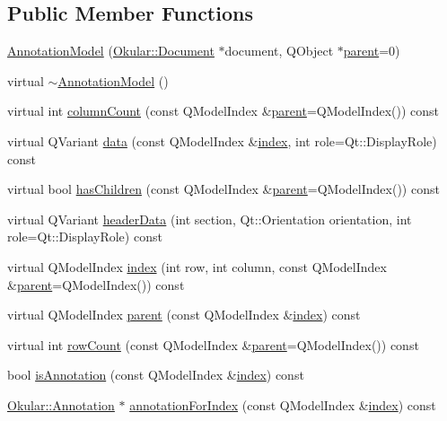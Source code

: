 \subsection*{Public Member Functions}
\begin{DoxyCompactItemize}
\item 
\hyperlink{classAnnotationModel_a29e844bf6e46f3dfa68da27d697bfdd4}{Annotation\+Model} (\hyperlink{classOkular_1_1Document}{Okular\+::\+Document} $\ast$document, Q\+Object $\ast$\hyperlink{classAnnotationModel_a162b06526b09c901a687d982051f639c}{parent}=0)
\item 
virtual \hyperlink{classAnnotationModel_ada5d073aa78e291b8422def55dd62199}{$\sim$\+Annotation\+Model} ()
\item 
virtual int \hyperlink{classAnnotationModel_a4a3dd262e42e0da24efa05adb42b1e70}{column\+Count} (const Q\+Model\+Index \&\hyperlink{classAnnotationModel_a162b06526b09c901a687d982051f639c}{parent}=Q\+Model\+Index()) const 
\item 
virtual Q\+Variant \hyperlink{classAnnotationModel_a179ccebf0ac079ea298ebafa9347eac1}{data} (const Q\+Model\+Index \&\hyperlink{classAnnotationModel_a0f1848b826fd58979667dc6f5966fee8}{index}, int role=Qt\+::\+Display\+Role) const 
\item 
virtual bool \hyperlink{classAnnotationModel_a596a4986b66a9d3271856f0bff06bfd0}{has\+Children} (const Q\+Model\+Index \&\hyperlink{classAnnotationModel_a162b06526b09c901a687d982051f639c}{parent}=Q\+Model\+Index()) const 
\item 
virtual Q\+Variant \hyperlink{classAnnotationModel_a798301e19593d4861ec83edec04aa29d}{header\+Data} (int section, Qt\+::\+Orientation orientation, int role=Qt\+::\+Display\+Role) const 
\item 
virtual Q\+Model\+Index \hyperlink{classAnnotationModel_a0f1848b826fd58979667dc6f5966fee8}{index} (int row, int column, const Q\+Model\+Index \&\hyperlink{classAnnotationModel_a162b06526b09c901a687d982051f639c}{parent}=Q\+Model\+Index()) const 
\item 
virtual Q\+Model\+Index \hyperlink{classAnnotationModel_a162b06526b09c901a687d982051f639c}{parent} (const Q\+Model\+Index \&\hyperlink{classAnnotationModel_a0f1848b826fd58979667dc6f5966fee8}{index}) const 
\item 
virtual int \hyperlink{classAnnotationModel_a519bc642d990f530aa3a4315d819a0d2}{row\+Count} (const Q\+Model\+Index \&\hyperlink{classAnnotationModel_a162b06526b09c901a687d982051f639c}{parent}=Q\+Model\+Index()) const 
\item 
bool \hyperlink{classAnnotationModel_a29cb1f9d54f20e8024dffcb3433a446f}{is\+Annotation} (const Q\+Model\+Index \&\hyperlink{classAnnotationModel_a0f1848b826fd58979667dc6f5966fee8}{index}) const 
\item 
\hyperlink{classOkular_1_1Annotation}{Okular\+::\+Annotation} $\ast$ \hyperlink{classAnnotationModel_a0cbda99ade41f0b580b55a9d6ba08d1f}{annotation\+For\+Index} (const Q\+Model\+Index \&\hyperlink{classAnnotationModel_a0f1848b826fd58979667dc6f5966fee8}{index}) const 
\end{DoxyCompactItemize}
